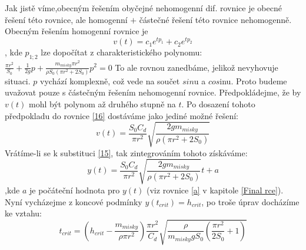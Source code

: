 \documentclass[14pt,a4paper]{article}
\begin{document}
Jak jistě víme,obecným řešením obyčejné nehomogenní dif. rovnice je obecné řešení této rovnice, ale homogenní $+$ částečné řešení této rovnice nehomogenně.
Obecným řešením homogenní rovnice je $$v(t)=c_1e^{tp_1}+c_2e^{tp_2}$$, kde $p_{1;2}$ lze dopočítat z charakteristického polynomu:$
\frac{\pi r^2}{S_0}+\frac{1}{2g}p+\frac{m_{misky}\pi r^2}{\rho S_0(\pi r^{2}+2S_0)}p^{2}=0$
To ale rovnou zanedbáme, jelikož nevyhovuje situaci. $p$ vychází komplexně, což vede na součet $sin$u a $cos$inu. Proto budeme uvažovat pouze s částečným řešením nehomogenní rovnice. Předpokládejme, že by $v(t)$ mohl být polynom až druhého stupně na $t$. Po dosazení tohoto předpokladu do rovnice \ref{16} dostáváme jako jediné možné řešení: \begin{equation*}
v(t)=\frac{S_0C_d}{\pi r^2}\sqrt{\frac{2gm_{misky}}{\rho \left(\pi r^{2}+2S_0\right)}}
\end{equation*}
Vrátíme-li se k substituci \ref{15}, tak zintegrováním tohoto získáváme:
 \begin{equation*}
y(t)=\frac{S_0C_d}{\pi r^2}\sqrt{\frac{2gm_{misky}}{\rho \left(\pi r^{2}+2S_0\right)}} t+a
\end{equation*}
,kde $a$ je počáteční hodnota pro $y(t)$ (viz rovnice \ref{a} v kapitole \ref{Final rce}). \\
Nyní vycházejme z koncové podmínky $y(t_{crit})=h_{crit}$, po troše úprav docházíme ke vztahu:
$$t_{crit}=\left(h_{crit}-\frac{m_{misky}}{\rho \pi r^{2}}\right) \frac{\pi r^2}{C_d} \sqrt{\frac{\rho}{m_{misky}gS_0}\left(\frac{\pi r^2}{2S_0}+1\right)}$$ 
\end{document}
